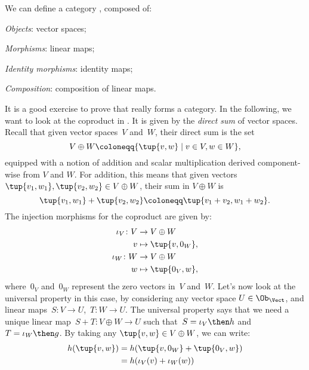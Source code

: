 \begin{example}
We can define a category \Vect, composed of:
\begin{compactitem}
\item \emph{Objects}: vector spaces;
\item \emph{Morphisms}: linear maps;
\item \emph{Identity morphisms}: identity maps;
\item \emph{Composition}: composition of linear maps.
\end{compactitem}
It is a good exercise to prove that \Vect really forms a category. In the following, we want to look at the coproduct in \Vect. It is given by the \emph{direct sum} of vector spaces. Recall that given vector spaces~$V$ and~$W$, their direct sum is the set
\begin{equation*}
    V\oplus W\coloneqq \{\tup{v,w}\mid v\in V,w\in W\},
\end{equation*}
equipped with a notion of addition and scalar multiplication derived component-wise from $V$ and $W$. For addition, this means that given vectors~$\tup{v_1,w_1},\tup{v_2,w_2}\in V\oplus W$, their sum in $V \oplus W$ is
\begin{equation*}
    \tup{v_1,w_1}+\tup{v_2,w_2}\coloneqq \tup{v_1+v_2,w_1+w_2}.
\end{equation*}
The injection morphisms for the coproduct are given by:
\begin{equation*}
    \begin{aligned}
    \iota_V\colon V&\to V\oplus W\\
    v&\mapsto \tup{v,0_W},\\
    \iota_W\colon W&\to V\oplus W\\
    w&\mapsto \tup{0_V,w},
    \end{aligned}
\end{equation*}
where~$0_V$ and~$0_W$ represent the zero vectors in~$V$ and~$W$. Let's now look at the universal property in this case, by considering any vector space $U\in \Ob_\Vect$, and linear maps~$S\colon V\to U$,~$T\colon W\to U$. The universal property says that we need a unique linear map~$S+T\colon V\oplus W \to U$ such that~$S=\iota_V\then h$ and~$T=\iota_W\then g$. By taking any $\tup{v,w}\in V\oplus W$, we can write:
\begin{equation*}
    \begin{aligned}
    h(\tup{v,w})&=h(\tup{v,0_W}+\tup{0_V,w})\\
    &=h(\iota_V(v)+\iota_W(w)) \\

\end{aligned}
\end{equation*}
\end{example}
